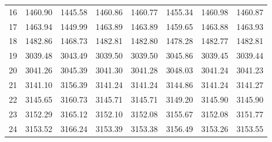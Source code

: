 \documentclass[10pt,oneside]{article}
\begin{document}
\begin{table}[h!]
\begin{tabular}{cccccccc}
16 &   1460.90 & 1445.58 & 1460.86 & 1460.77 &      1455.34 & 1460.98 & 1460.87 \\
17 &   1463.94 & 1449.99 & 1463.89 & 1463.89 &      1459.65 & 1463.88 & 1463.93 \\
18 &   1482.86 & 1468.73 & 1482.81 & 1482.80 &      1478.28 & 1482.77 & 1482.81 \\
19 &   3039.48 & 3043.49 & 3039.50 & 3039.50 &      3045.86 & 3039.45 & 3039.44 \\
20 &   3041.26 & 3045.39 & 3041.30 & 3041.28 &      3048.03 & 3041.24 & 3041.23 \\
21 &   3141.10 & 3156.39 & 3141.24 & 3141.24 &      3144.86 & 3141.24 & 3141.27 \\
22 &   3145.65 & 3160.73 & 3145.71 & 3145.71 &      3149.20 & 3145.90 & 3145.90 \\
23 &   3152.29 & 3165.12 & 3152.10 & 3152.08 &      3155.67 & 3152.08 & 3151.77 \\
24 &   3153.52 & 3166.24 & 3153.39 & 3153.38 &      3156.49 & 3153.26 & 3153.55 \\
\bottomrule
\end{tabular}
\end{table}

\clearpage
\end{document}
